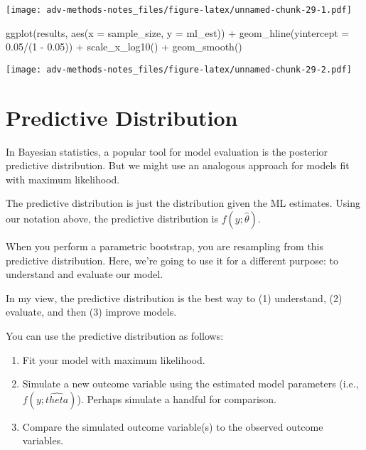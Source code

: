 \documentclass[
]{book}
\newenvironment{Shaded}{\begin{snugshade}}{\end{snugshade}}
\newcommand{\AttributeTok}[1]{\textcolor[rgb]{0.77,0.63,0.00}{#1}}
\newcommand{\DecValTok}[1]{\textcolor[rgb]{0.00,0.00,0.81}{#1}}
\newcommand{\FloatTok}[1]{\textcolor[rgb]{0.00,0.00,0.81}{#1}}
\newcommand{\FunctionTok}[1]{\textcolor[rgb]{0.00,0.00,0.00}{#1}}
\newcommand{\NormalTok}[1]{#1}
\newcommand{\SpecialCharTok}[1]{\textcolor[rgb]{0.00,0.00,0.00}{#1}}
\providecommand{\tightlist}{%
  \setlength{\itemsep}{0pt}\setlength{\parskip}{0pt}}
\begin{document}
\texttt{[image: adv-methods-notes\_files/figure-latex/unnamed-chunk-29-1.pdf]}

\begin{Shaded}
\begin{Highlighting}[]
\FunctionTok{ggplot}\NormalTok{(results, }\FunctionTok{aes}\NormalTok{(}\AttributeTok{x =}\NormalTok{ sample\_size, }\AttributeTok{y =}\NormalTok{ ml\_est)) }\SpecialCharTok{+} 
  \FunctionTok{geom\_hline}\NormalTok{(}\AttributeTok{yintercept =} \FloatTok{0.05}\SpecialCharTok{/}\NormalTok{(}\DecValTok{1} \SpecialCharTok{{-}} \FloatTok{0.05}\NormalTok{)) }\SpecialCharTok{+} 
  \FunctionTok{scale\_x\_log10}\NormalTok{() }\SpecialCharTok{+} 
  \FunctionTok{geom\_smooth}\NormalTok{()}
\end{Highlighting}
\end{Shaded}

\texttt{[image: adv-methods-notes\_files/figure-latex/unnamed-chunk-29-2.pdf]}

\hypertarget{predictive-distribution}{%
\section{Predictive Distribution}\label{predictive-distribution}}

In Bayesian statistics, a popular tool for model evaluation is the
posterior predictive distribution. But we might use an analogous
approach for models fit with maximum likelihood.

The predictive distribution is just the distribution given the ML
estimates. Using our notation above, the predictive distribution is
\(f(y; \hat{\theta})\).

When you perform a parametric bootstrap, you are resampling from this
predictive distribution. Here, we're going to use it for a different
purpose: to understand and evaluate our model.

In my view, the predictive distribution is the best way to (1)
understand, (2) evaluate, and then (3) improve models.

You can use the predictive distribution as follows:

\begin{enumerate}
\def\labelenumi{\arabic{enumi}.}
\tightlist
\item
  Fit your model with maximum likelihood.
\item
  Simulate a new outcome variable using the estimated model parameters
  (i.e., \(f(y; \hat{theta})\)). Perhaps simulate a handful for
  comparison.
\item
  Compare the simulated outcome variable(s) to the observed outcome
  variables.
\end{enumerate}
\end{document}
